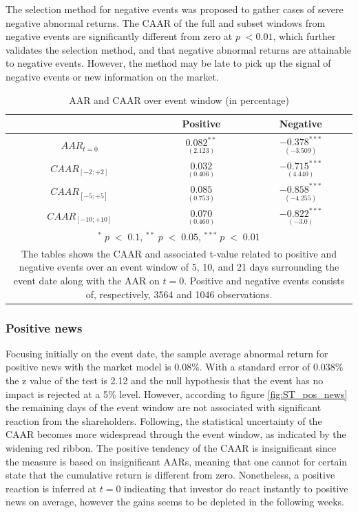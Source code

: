 The selection method for negative events was proposed to gather cases of severe negative abnormal returns. The CAAR of the full and subset windows from negative events are significantly different from zero at $p \; < 0.01$, which further validates the selection method, and that negative abnormal returns are attainable to negative events. However, the method may be late to pick up the signal of negative events or new information on the market.  

\begin{table}[ht]
\centering
\caption{AAR and CAAR over event window (in percentage)} 
\begin{tabular}{ccc}
  \hline  \hline
  & \multicolumn{1}{c}{Positive} &  \multicolumn{1}{c}{Negative}\\  
 \hline
$AAR_{t=0}$ &  $\underset{(2.123)}{0.082^{**}}$ & $\underset{(-3.509)}{-0.378^{***}}$ \\ 
$CAAR_{[-2;+2]}$  & $\underset{(0.406)}{0.032}$ & $\underset{(4.440)}{-0.715^{***}}$ \\ 
$CAAR_{[-5;+5]}$  & $\underset{(0.753)}{0.085}$ & $\underset{(-4.255)}{-0.858^{***}}$ \\ 
$CAAR_{[-10;+10]}$    & $\underset{(0.460)}{0.070}$ & $\underset{(-3.0)}{-0.822^{***}}$ \\ 
   \hline \hline
   \multicolumn{3}{p{10cm}}{ \footnotesize $^* \; p\; <\; 0.1$, $ ^{**} \; p\; <\; 0.05$, $ ^{***} \; p\; <\; 0.01$  } \\
   \multicolumn{3}{p{10cm}}{\footnotesize The tables shows the CAAR and associated t-value related to positive and negative events over an event window of 5, 10, and 21 days surrounding the event date along with the AAR on $t=0$. Positive and negative events consists of, respectively, 3564 and 1046 observations. } \\
   \hline
\end{tabular}
\label{tab: ST_significance}
\end{table}

\subsubsection{Positive news}

Focusing initially on the event date, the sample average abnormal return for positive news with the market model is 0.08\%. With a standard error of 0.038\% the z value of the test is 2.12 and the null hypothesis that the event has no impact is rejected at a 5\% level. However, according to figure \ref{fig:ST_pos_news} the remaining days of the event window are not associated with significant reaction  from the shareholders. Following, the statistical uncertainty of the CAAR becomes more widespread through the event window, as indicated by the widening red ribbon. The positive tendency of the CAAR is insignificant since the measure is based on insignificant AARs, meaning that one cannot for certain state that the cumulative return is different from zero. Nonetheless, a positive reaction is inferred at $t=0$ indicating that investor do react instantly to positive news on average, however the gains seems to be depleted in the following weeks.  

